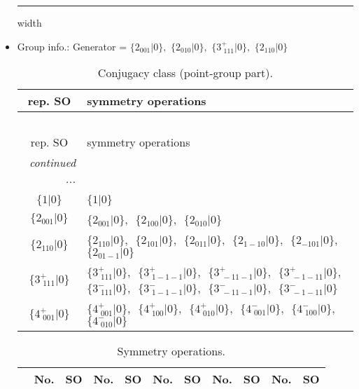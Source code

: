 \documentclass[fleqn,10pt,landscape]{article}
\begin{document}
\begin{itemize}
 \hfil \hrule height 1mm width \textwidth \hfil

\item Group info.: Generator = $\{2{}_{001}|0\},\,\,\{2{}_{010}|0\},\,\,\{3^{+}_{\,\,111}|0\},\,\,\{2{}_{110}|0\}$

\begin{center}
\renewcommand{\arraystretch}{1.3}
\begin{longtable}{c|l}
\caption{Conjugacy class (point-group part).}
 \\
 \hline \hline
rep. SO & symmetry operations \\ \hline \endfirsthead

\multicolumn{1}{l}{\tablename\ \thetable{}} \\
 \hline \hline
rep. SO & symmetry operations \\ \hline \endhead

 \hline \hline
\multicolumn{1}{r}{\footnotesize\it continued ...} \\ \endfoot

 \hline \hline
\multicolumn{1}{r}{} \\ \endlastfoot

$\{1|0\}$ & $\{1|0\}$ \\ \hline
$\{2{}_{001}|0\}$ & $\{2{}_{001}|0\}$,\,\, $\{2{}_{100}|0\}$,\,\, $\{2{}_{010}|0\}$ \\ \hline
$\{2{}_{110}|0\}$ & $\{2{}_{110}|0\}$,\,\, $\{2{}_{101}|0\}$,\,\, $\{2{}_{011}|0\}$,\,\, $\{2{}_{1-10}|0\}$,\,\, $\{2{}_{-101}|0\}$,\,\, $\{2{}_{01-1}|0\}$ \\ \hline
$\{3^{+}_{\,\,111}|0\}$ & $\{3^{+}_{\,\,111}|0\}$,\,\, $\{3^{+}_{\,\,1-1-1}|0\}$,\,\, $\{3^{+}_{\,\,-11-1}|0\}$,\,\, $\{3^{+}_{\,\,-1-11}|0\}$,\,\, $\{3^{-}_{\,\,111}|0\}$,\,\, $\{3^{-}_{\,\,1-1-1}|0\}$,\,\, $\{3^{-}_{\,\,-11-1}|0\}$,\,\, $\{3^{-}_{\,\,-1-11}|0\}$ \\ \hline
$\{4^{+}_{\,\,001}|0\}$ & $\{4^{+}_{\,\,001}|0\}$,\,\, $\{4^{+}_{\,\,100}|0\}$,\,\, $\{4^{+}_{\,\,010}|0\}$,\,\, $\{4^{-}_{\,\,001}|0\}$,\,\, $\{4^{-}_{\,\,100}|0\}$,\,\, $\{4^{-}_{\,\,010}|0\}$ \\
\end{longtable}
\end{center}
\begin{center}
\renewcommand{\arraystretch}{1.3}
\begin{longtable}{c|cc|cc|cc|cc|cc}
\caption{Symmetry operations.}
 \\
 \hline \hline
 & No. & SO & No. & SO & No. & SO & No. & SO & No. & SO \\ \hline \endfirsthead


\end{longtable}
\end{center}
\end{itemize}
\end{document}
